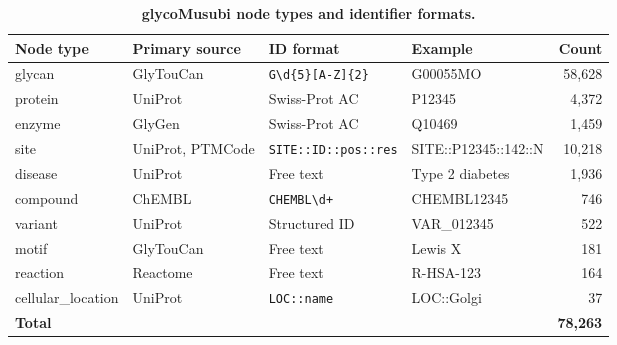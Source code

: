 \documentclass[11pt,a4paper]{article}
\begin{document}
\begin{table}[H]
\centering
\caption{\textbf{glycoMusubi node types and identifier formats.}}
\label{tab:node_types}
\small
\begin{tabular}{llllr}
\toprule
\textbf{Node type} & \textbf{Primary source} & \textbf{ID format} & \textbf{Example} & \textbf{Count} \\
\midrule
glycan    & GlyTouCan  & \texttt{G\textbackslash d\{5\}[A-Z]\{2\}} & G00055MO & 58,628 \\
protein   & UniProt    & Swiss-Prot AC     & P12345   & 4,372 \\
enzyme    & GlyGen     & Swiss-Prot AC     & Q10469   & 1,459 \\
site      & UniProt, PTMCode & \texttt{SITE::ID::pos::res} & SITE::P12345::142::N & 10,218 \\
disease   & UniProt    & Free text         & Type 2 diabetes & 1,936 \\
compound  & ChEMBL     & \texttt{CHEMBL\textbackslash d+} & CHEMBL12345 & 746 \\
variant   & UniProt    & Structured ID     & VAR\_012345 & 522 \\
motif     & GlyTouCan  & Free text         & Lewis X   & 181 \\
reaction  & Reactome   & Free text         & R-HSA-123 & 164 \\
cellular\_location & UniProt & \texttt{LOC::name} & LOC::Golgi & 37 \\
\midrule
\multicolumn{4}{l}{\textbf{Total}} & \textbf{78,263} \\
\bottomrule
\end{tabular}
\end{table}
\end{document}

